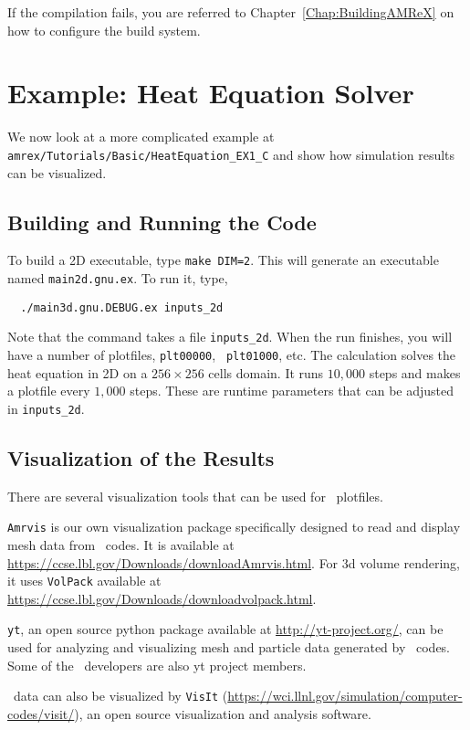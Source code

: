 If the compilation fails, you are referred to
Chapter~\ref{Chap:BuildingAMReX} on how to configure the build
system.

\section{Example: Heat Equation Solver}

We now look at a more complicated example at {\tt
  amrex/Tutorials/Basic/HeatEquation\_EX1\_C} and show how simulation
results can be visualized.

\subsection{Building and Running the Code}

To build a 2D executable, type {\tt make DIM=2}.  This will generate
an executable named {\tt main2d.gnu.ex}.  To run it, type,
\begin{verbatim}
  ./main3d.gnu.DEBUG.ex inputs_2d
\end{verbatim}
Note that the command takes a file {\tt inputs\_2d}.  When the run
finishes, you will have a number of plotfiles, {\tt plt00000}, {\tt
  plt01000}, etc.  The calculation solves the heat equation in 2D on a
$256 \times 256$ cells domain.  It runs $10,000$ steps and makes a
plotfile every $1,000$ steps.  These are runtime parameters that can
be adjusted in {\tt inputs\_2d}.

\subsection{Visualization of the Results}

There are several visualization tools that can be used for \amrex\
plotfiles.  

{\tt Amrvis} is our own visualization package specifically designed to
read and display mesh data from \amrex\ codes.  It is available at
\url{https://ccse.lbl.gov/Downloads/downloadAmrvis.html}.  For 3d
volume rendering, it uses {\tt VolPack} available at
\url{https://ccse.lbl.gov/Downloads/downloadvolpack.html}.

{\tt yt}, an open source python package available at
\url{http://yt-project.org/}, can be used for analyzing and
visualizing mesh and particle data generated by \amrex\ codes.  Some
of the \amrex\ developers are also yt project members.

\amrex\ data can also be visualized by {\tt VisIt}
(\url{https://wci.llnl.gov/simulation/computer-codes/visit/}), an open
source visualization and analysis software.


